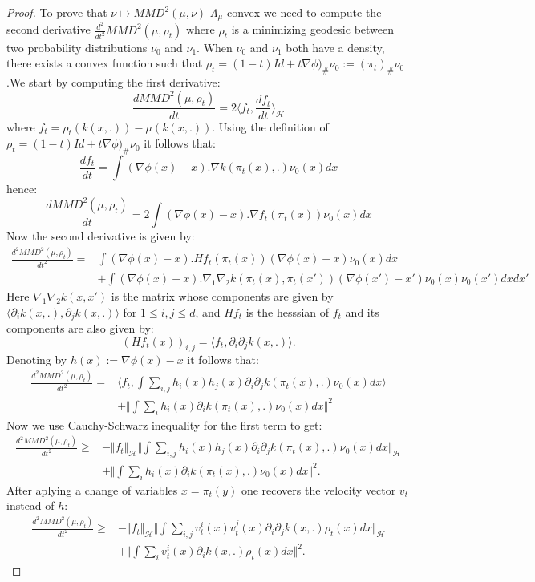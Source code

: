 \begin{proof}
To prove that $\nu\mapsto MMD^{2}(\mu,\nu)$ $\Lambda_{\mu}$-convex
we need to compute the second derivative $\frac{d^{2}}{dt^{2}}MMD^{2}(\mu,\rho_{t})$
where $\rho_{t}$ is a minimizing geodesic between two probability
distributions $\nu_{0}$ and $\nu_{1}$. When $\nu_{0}$ and $\nu_{1}$
both have a density, there exists a convex function such that $\rho_{t}=(1-t)Id+t\nabla\phi)_{\#}\nu_{0}:=(\pi_{t})_{\#}\nu_{0}$
.We start by computing the first derivative:
\[
\frac{dMMD^{2}(\mu,\rho_{t})}{dt}=2\langle f_{t},\frac{df_{t}}{dt}\rangle_{\mathcal{H}}
\]
where $f_{t}=\rho_{t}(k(x,.))-\mu(k(x,.))$. Using the definition
of $\rho_{t}=(1-t)Id+t\nabla\phi)_{\#}\nu_0$ it follows that:
\[
\frac{df_{t}}{dt}=\int(\nabla\phi(x)-x).\nabla k(\pi_{t}(x),.)\nu_{0}(x)dx
\]
hence:
\[
\frac{dMMD^{2}(\mu,\rho_{t})}{dt}=2\int(\nabla\phi(x)-x).\nabla f_{t}(\pi_{t}(x))\nu_{0}(x)dx
\]
Now the second derivative is given by:
\begin{align*}
\frac{d^{2}MMD^{2}(\mu,\rho_{t})}{dt^{2}}= & \int(\nabla\phi(x)-x).Hf_{t}(\pi_{t}(x))(\nabla\phi(x)-x)\nu_{0}(x)dx\\
 & +\int(\nabla\phi(x)-x).\nabla_{1}\nabla_{2}k(\pi_{t}(x),\pi_{t}(x'))(\nabla\phi(x')-x')\nu_{0}(x)\nu_{0}(x')dxdx'
\end{align*}
Here $\nabla_{1}\nabla_{2}k(x,x')$ is the matrix whose components
are given by $\langle\partial_{i}k(x,.),\partial_{j}k(x,.)\rangle$
for $1\leq i,j\leq d$, and $Hf_{t}$ is the hesssian of $f_{t}$
and its components are also given by:
\[
(Hf_{t}(x))_{i,j}=\langle f_{t},\partial_{i}\partial_{j}k(x,.)\rangle.
\]
Denoting by $h(x):=\nabla\phi(x)-x$ it follows that:
\begin{align*}
\frac{d^{2}MMD^{2}(\mu,\rho_{t})}{dt^{2}}= & \langle f_{t},\int\sum_{i,j}h_{i}(x)h_{j}(x)\partial_{i}\partial_{j}k(\pi_{t}(x),.)\nu_{0}(x)dx\rangle\\
 & +\Vert\int\sum_{i}h_{i}(x)\partial_{i}k(\pi_{t}(x),.)\nu_{0}(x)dx\Vert^{2}
\end{align*}
Now we use Cauchy-Schwarz inequality for the first term to get:
\begin{align*}
\frac{d^{2}MMD^{2}(\mu,\rho_{t})}{dt^{2}}\geq & -\Vert f_{t}\Vert_{\mathcal{H}}\Vert\int\sum_{i,j}h_{i}(x)h_{j}(x)\partial_{i}\partial_{j}k(\pi_{t}(x),.)\nu_{0}(x)dx\Vert_{\mathcal{H}}\\
 & +\Vert\int\sum_{i}h_{i}(x)\partial_{i}k(\pi_{t}(x),.)\nu_{0}(x)dx\Vert^{2}.
\end{align*}
After aplying a change of variables $x=\pi_{t}(y)$ one recovers the
velocity vector $v_{t}$ instead of $h$: 
\begin{align*}
\frac{d^{2}MMD^{2}(\mu,\rho_{t})}{dt^{2}}\geq & -\Vert f_{t}\Vert_{\mathcal{H}}\Vert\int\sum_{i,j}v_{t}^{i}(x)v_{t}^{j}(x)\partial_{i}\partial_{j}k(x,.)\rho_{t}(x)dx\Vert_{\mathcal{H}}\\
 & +\Vert\int\sum_{i}v_{t}^{i}(x)\partial_{i}k(x,.)\rho_{t}(x)dx\Vert^{2}.
\end{align*}


\end{proof}
